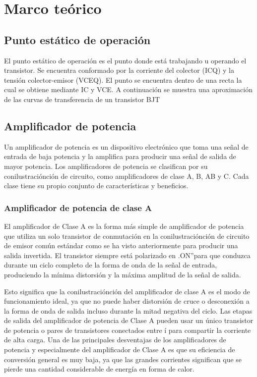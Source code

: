 \section{Marco teórico}

\subsection{Punto estático de operación}

El punto estático de operación es el punto donde está trabajando u operando el transistor. Se encuentra
conformado por la corriente del colector (ICQ) y la tensión colector-emisor (VCEQ). El punto se encuentra dentro de una recta la
cual se obtiene mediante IC y VCE. A continuación se muestra una aproximación de las curvas de transferencia de un transistor
BJT

\subsection{Amplificador de potencia}
Un amplificador de potencia es un dispositivo electrónico que toma una señal de entrada de baja potencia y la amplifica
para producir una señal de salida de mayor potencia. Los amplificadores de potencia se clasifican por su conilustraciónción de circuito,
como amplificadores de clase A, B, AB y C. Cada clase tiene su propio conjunto de características y beneficios.

\subsubsection{Amplificador de potencia de clase A}

El amplificador de Clase A es la forma más simple de amplificador de potencia que
utiliza un solo transistor de conmutación en la conilustraciónción de circuito de emisor común
estándar como se ha visto anteriormente para producir una salida invertida. El transistor
siempre está polarizado en .ON”para que conduzca durante un ciclo completo de la forma
de onda de la señal de entrada, produciendo la mínima distorsión y la máxima amplitud de
la señal de salida.

Esto significa que la conilustraciónción del amplificador de clase A es el modo de funcionamiento ideal, ya que no puede haber distorsión de cruce o desconexión a la forma de onda
de salida incluso durante la mitad negativa del ciclo. Las etapas de salida del amplificador
de potencia de Clase A pueden usar un único transistor de potencia o pares de transistores
conectados entre í para compartir la corriente de alta carga. Una de las principales desventajas de los amplificadores de potencia y especialmente del amplificador de Clase A es
que su eficiencia de conversión general es muy baja, ya que las grandes corrientes significan
que se pierde una cantidad considerable de energía en forma de calor.

